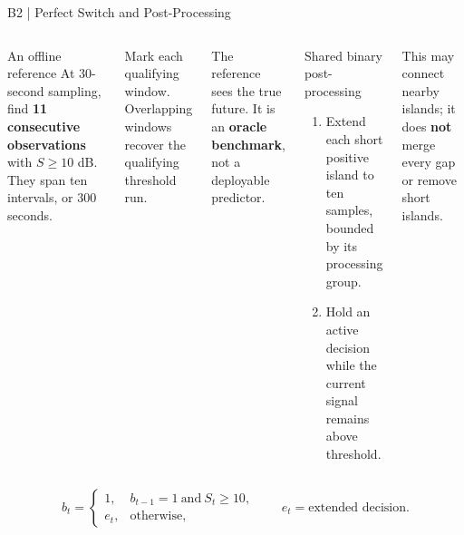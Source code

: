 \begin{frame}[noframenumbering]{B2 | Perfect Switch and Post-Processing}
\begin{columns}[T,onlytextwidth]
\begin{block}{An offline reference}
At 30-second sampling, find \textbf{11 consecutive observations} with $S\geq10$ dB. They span ten intervals, or 300 seconds.
\end{block}
\small Mark each qualifying window. Overlapping windows recover the qualifying threshold run.
\vspace{3mm}

The reference sees the true future. It is an \textbf{oracle benchmark}, not a deployable predictor.
\begin{block}{Shared binary post-processing}
\begin{enumerate}
\item Extend each short positive island to ten samples, bounded by its processing group.
\item Hold an active decision while the current signal remains above threshold.
\end{enumerate}
\end{block}
\small This may connect nearby islands; it does \textbf{not} merge every gap or remove short islands.
\end{columns}
\vspace{3mm}
\[
b_t=\begin{cases}1,&b_{t-1}=1\ \text{and}\ S_t\geq10,\\e_t,&\text{otherwise},\end{cases}
\qquad e_t=\text{extended decision}.
\]
\end{frame}

